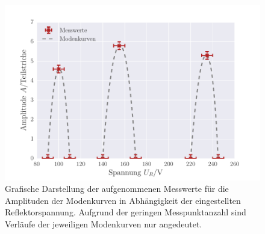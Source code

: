 \begin{figure}[!h]
 \centering
 \includegraphics[scale=0.9]{../Grafiken/Modenkurven.pdf}
 \caption{Grafische Darstellung der aufgenommenen Messwerte für die Amplituden der Modenkurven in 
 	Abhängigkeit der eingestellten Reflektorspannung. Aufgrund der geringen Messpunktanzahl sind Verläufe der 
 jeweiligen Modenkurven nur angedeutet. \label{fig:modenkurven}}
 \end{figure} 